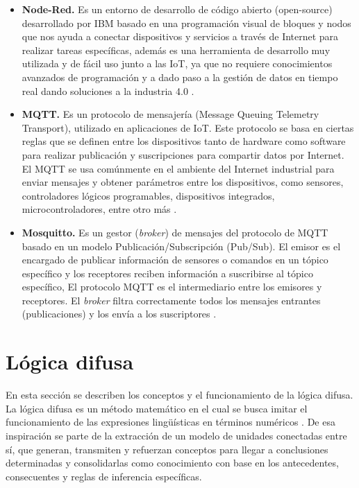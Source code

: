 \begin{itemize}
\item \textbf{Node-Red.} Es un entorno de desarrollo de código abierto (open-source) desarrollado por IBM basado en una programación visual de bloques y nodos que nos ayuda a conectar dispositivos y servicios a través de Internet para realizar tareas específicas, además es una herramienta de desarrollo muy utilizada y de fácil uso junto a las IoT, ya que no requiere conocimientos avanzados de programación y a dado paso a la gestión de datos en tiempo real dando soluciones a la industria 4.0 \cite{NodeRed}.

\item \textbf{MQTT.} Es un protocolo de mensajería (Message Queuing Telemetry Transport), utilizado en aplicaciones de IoT. Este protocolo se basa en ciertas reglas que se definen entre los dispositivos tanto de hardware como software para realizar publicación y suscripciones para compartir datos por Internet. El MQTT se usa comúnmente en el ambiente del Internet industrial para enviar mensajes y obtener parámetros entre los dispositivos, como sensores, controladores lógicos programables, dispositivos integrados, microcontroladores, entre otro más \cite{hillar2018hands}.
 
\item \textbf{Mosquitto.} Es un gestor (\textit{broker}) de mensajes del protocolo de MQTT basado en un modelo Publicación/Subscripción (Pub/Sub). El emisor es el encargado de publicar información de sensores o comandos en un tópico específico y los receptores reciben información a suscribirse al tópico específico, El protocolo MQTT es el intermediario entre los emisores y receptores. El \textit{broker} filtra correctamente todos los mensajes entrantes (publicaciones) y los envía a los suscriptores \cite{ wangconstruction}. 
\end{itemize}


\section{Lógica difusa}
En esta sección se describen los conceptos y el funcionamiento de la lógica difusa. La lógica difusa es un método matemático en el cual se busca imitar el funcionamiento de las expresiones lingüísticas en términos numéricos \cite{zadeh1965fuzzy}. De esa inspiración se parte de la extracción de un modelo de unidades conectadas entre sí, que generan, transmiten y refuerzan conceptos para llegar a conclusiones determinadas y consolidarlas como conocimiento con base en los antecedentes, consecuentes y reglas de inferencia específicas. 

